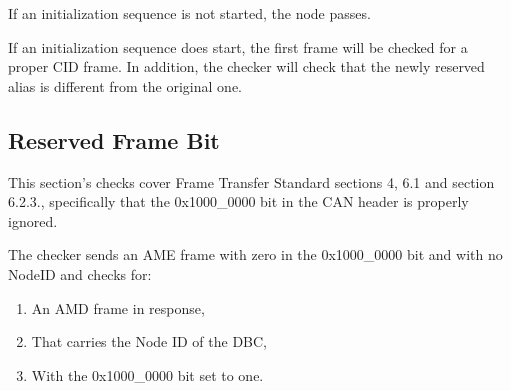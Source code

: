 \documentclass[11pt]{article}
\begin{document}
If an initialization sequence is not started, the node passes.

If an initialization sequence does start, the first frame will be checked for a proper CID frame.  
In addition, the checker will check that the 
newly reserved alias is different from the original one.

\subsection{Reserved Frame Bit}

This section's checks cover Frame Transfer Standard sections 4, 6.1 and section 6.2.3., 
specifically that the 0x1000\_0000 bit in the CAN header is properly
ignored.

The checker sends an AME frame with zero in the 0x1000\_0000 bit
and with no NodeID and checks for:
\begin{enumerate}
\item An AMD frame in response,
\item That carries the Node ID of the DBC,
\item With the 0x1000\_0000 bit set to one.
\end{enumerate}
\end{document}

